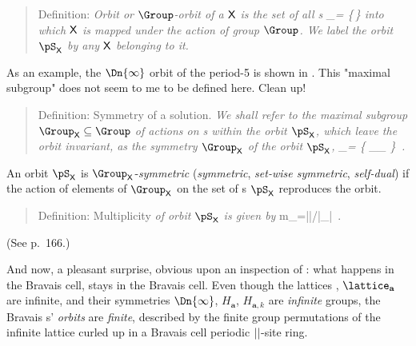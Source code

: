     \begin{quote}
Definition: {\em
{\em Orbit} or \emph{$\Group$-orbit} of a {\lattstate} $\mathsf{X}$ is the
set of all {\lattstate}s
\beq
    \pS_\Xx = \{\LieEl\,\Xx \mid \LieEl \in {\Group}\}
into which $\mathsf{X}$ is mapped under the action of group $\Group$.
We label the orbit $\pS_\Xx$ by any {\lattstate} $\mathsf{X}$ belonging to
it.
            }
    \end{quote}
As an example, the $\Dn{\infty}$ orbit of the period-5 {\lattstate}
is shown in .
     {
    This "maximal subgroup" does not seem to me to be defined here.
    Clean up!
    }
    \begin{quote}
Definition: Symmetry of a solution.
{\em
We shall refer to the maximal subgroup $\Group_\Xx \subseteq  \Group$ of
actions on {\lattstate}s within the orbit $\pS_\Xx$, which leave
the orbit invariant, as the \emph{symmetry}
$\Group_\Xx$ of the orbit $\pS_\Xx$,
\beq
\Group_\Xx =
   \{ \LieEl \in \Group_\Xx \mid \LieEl \Xx \in \pS_\Xx
   \}
\,.
}
    \end{quote}
An orbit $\pS_\Xx$ is $\Group_\Xx$-{\em symmetric}
({\em symmetric}, {\em set-wise symmetric}, {\em self-dual})
if the action of elements of $\Group_\Xx$ on
the set of {\lattstate}s $\pS_\Xx$ reproduces the orbit.
%
    \begin{quote}
Definition: Multiplicity
{\em
of orbit $\pS_\Xx$ is given by
}
\beq
m_\Xx=|\Group|/|\Group_{\Xx}|
\,.
    \end{quote}
(See  {p.~166}.)



\bigskip

And now, a pleasant surprise, obvious upon an inspection of
: what happens
in the Bravais cell, stays in the Bravais cell.
Even though
the lattices \lattice, $\lattice_{\mathbf{a}}$ are infinite,
and their symmetries
$\Dn{\infty}$, $H_{\mathbf{a}}$, $H_{\mathbf{a},k}$ are
\emph{infinite} groups, the Bravais {\lattstate}s'
\emph{orbits} are \emph{finite}, described by the finite group
permutations of the infinite lattice curled up in a Bravais cell periodic
${||}$-site ring.


